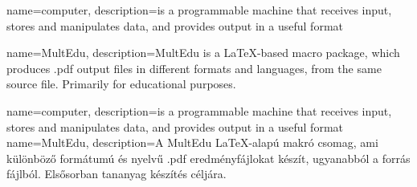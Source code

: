 
  {
	{
		name={computer},
		description={is a programmable machine that receives input,
			stores and manipulates data, and provides
			output in a useful format}
	}
	
	{
		name={MultEdu},
		description={MultEdu is a \LaTeX{}-based macro package, which produces .pdf output files in different formats and languages, from the same source file. Primarily for educational purposes.}
	}

 }	
 {}
  {%
	{
		name={computer},
		description={is a programmable machine that receives input,
			stores and manipulates data, and provides
			output in a useful format}
	}
	{
		name={MultEdu},
		description={A MultEdu  \LaTeX{}-alapú makró csomag, ami különböző formátumú és nyelvű .pdf eredményfájlokat készít, ugyanabból a forrás fájlból. Elsősorban tananyag készítés céljára.}
	}
  }
{
}